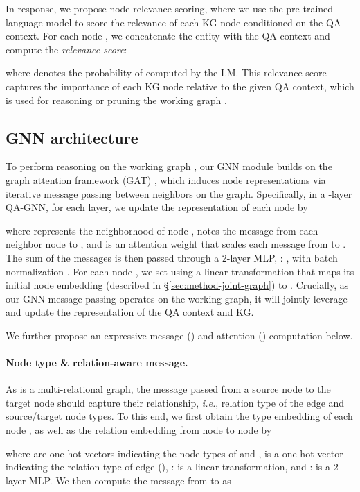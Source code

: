 \documentclass[11pt]{article}
\newcommand{\ie}{\textit{i.e.}}
\newcommand{\methodname}{QA-GNN\xspace}
\renewcommand\ttdefault{cmtt}
\begin{document}
In response, we propose node relevance scoring, where we use the pre-trained language model to score the relevance of each KG node  conditioned on the QA context. 
For each node , we concatenate the entity  with the QA context  and compute the \emph{relevance score}: 

where  denotes 
the probability of  computed by the LM.
This relevance score  captures the importance of each KG node relative to the given QA context, which is used for reasoning or pruning the working graph .




\subsection{GNN architecture}
\label{sec:method-gnn}

To perform reasoning on the working graph , our GNN module builds on the graph attention framework (GAT) \citep{velikovi2017graph}, 
which induces node representations via iterative message passing between neighbors on the graph.
Specifically, in a -layer \methodname, for each layer, we update the representation  of each node  by

where  represents the neighborhood of node ,  notes the message from each neighbor node  to , and  is an attention weight that scales each message  from  to . The sum of the messages is then passed through a 2-layer MLP,
: , with batch normalization \citep{ioffe2015batch}.
For each node , we set  using a linear transformation  that maps its initial node embedding (described in \S \ref{sec:method-joint-graph}) to .
Crucially, as our GNN message passing operates on the working graph, it will jointly leverage and update the representation of the QA context and KG.

\noindent
We further propose an expressive message () and attention () computation below.


\paragraph{Node type \& relation-aware message.}
\renewcommand\ttdefault{cmtt}
As  is a multi-relational graph, the
message passed from a source node to the target node should capture their relationship, \ie, relation type of the edge and source/target node types. 
To this end, we first obtain the type embedding  of each node , as well as the relation embedding  from node  to node  by

where 
are one-hot vectors indicating the node types of  and ,
 is a one-hot vector indicating the relation type of edge (),
:  is a linear transformation,
and 
:  is a 2-layer MLP.
We then compute the message from  to  as
\end{document}
